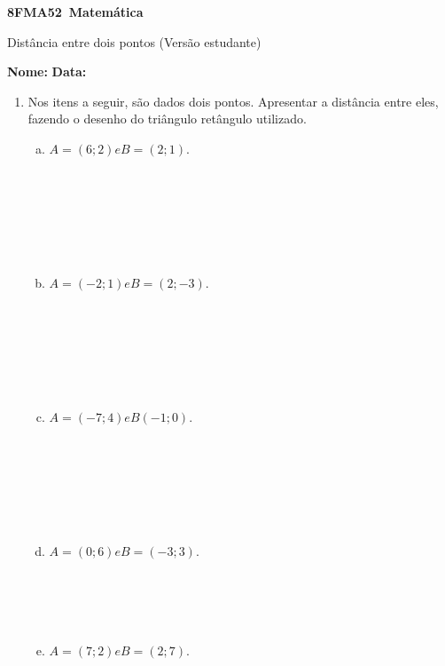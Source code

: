 \documentclass[a4paper,14pt]{article}
\begin{document}
	
	\noindent\textbf{8FMA52~Matemática} 
	
	\begin{center}Distância entre dois pontos (Versão estudante)
	\end{center}
	
	\noindent\textbf{Nome:} \underline{\hspace{10cm}}
	\noindent\textbf{Data:} \underline{\hspace{4cm}}
	
	
	
    \begin{multicols}{2}
    	\begin{enumerate}
    		\item Nos itens a seguir, são dados dois pontos. Apresentar a distância entre eles, fazendo o desenho do triângulo retângulo utilizado.
    		\begin{enumerate}[a)]
    			\item $A = (6; 2) e B = (2; 1)$. \\\\\\\\\\\\\\
    			\item $A = (-2; 1) e B = (2; -3)$.
    			\\\\\\\\\\\\\\
    			\item $A = (-7; 4) e B (-1; 0)$.
    			\\\\\\\\\\\\\\
    			\item $A =(0; 6) e B = (-3; 3)$.
    			\\\\\\\\\\
    			\item $A = (7; 2) e B = (2; 7)$.

\end{enumerate}
\end{enumerate}
\end{multicols}
\end{document}
